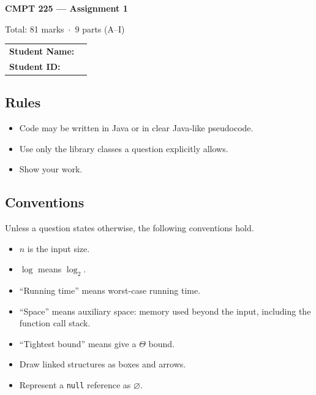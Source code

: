 \documentclass[11pt]{article}
\newcommand{\code}[1]{\mbox{\texttt{#1}}}  %
\begin{document}
\thispagestyle{cover}
\begin{center}
  {\LARGE\bfseries CMPT 225 --- Assignment 1\par}
  \medskip
  {\large Total: 81 marks \,$\cdot$\, 9 parts (A--I)\par}
\end{center}

\bigskip
\begin{tabular}{@{}l p{10cm}@{}}
  \textbf{Student Name:} & \hrulefill \\[16pt]
  \textbf{Student ID:}   & \hrulefill \\
\end{tabular}

\subsection*{Rules}
\begin{itemize}
  \item Code may be written in Java or in clear Java-like pseudocode.
  \item Use only the library classes a question explicitly allows.
  \item Show your work.
\end{itemize}

\subsection*{Conventions}
Unless a question states otherwise, the following conventions hold.
\begin{itemize}
  \item $n$ is the input size.
  \item $\log$ means $\log_2$.
  \item ``Running time'' means worst-case running time.
  \item ``Space'' means auxiliary space: memory used beyond the input,
        including the function call stack.
  \item ``Tightest bound'' means give a $\Theta$ bound.
  \item Draw linked structures as boxes and arrows.
  \item Represent a \code{null} reference as $\varnothing$.
\end{itemize}
\end{document}

